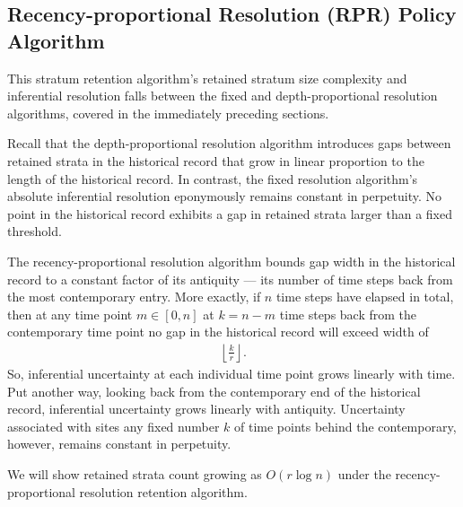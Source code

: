 \subsection{Recency-proportional Resolution (RPR) Policy Algorithm}
\label{sec:recency-proportional-resolution-algo}

This stratum retention algorithm's retained stratum size complexity and inferential resolution falls between the fixed and depth-proportional resolution algorithms, covered in the immediately preceding sections.

Recall that the depth-proportional resolution algorithm introduces gaps between retained strata in the historical record that grow in linear proportion to the length of the historical record.
In contrast, the fixed resolution algorithm's absolute inferential resolution eponymously remains constant in perpetuity.
No point in the historical record exhibits a gap in retained strata larger than a fixed threshold.

The recency-proportional resolution algorithm bounds gap width in the historical record to a constant factor of its antiquity --- its number of time steps back from the most contemporary entry.
More exactly, if $n$ time steps have elapsed in total, then at any time point $m \in [0, n]$ at $k = n - m$ time steps back from the contemporary time point no gap in the historical record will exceed width of
\begin{align}
  \left\lfloor \frac{k}{r} \right\rfloor.
  \label{eqn:rpr-gap}
\end{align}
So, inferential uncertainty at each individual time point grows linearly with time.
Put another way, looking back from the contemporary end of the historical record, inferential uncertainty grows linearly with antiquity.
Uncertainty associated with sites any fixed number $k$ of time points behind the contemporary, however, remains constant in perpetuity.

We will show retained strata count growing as $O(r\log{n})$ under the recency-proportional resolution retention algorithm.

